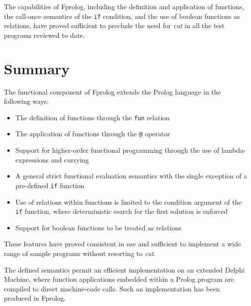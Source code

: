 \documentclass[a4paper,11pt,twoside]{article}
\begin{document}
The capabilities of Fprolog, including the definition and application of
functions, the call-once semantics of the \texttt{if} condition, and the
use of boolean functions as relations, have proved sufficient to preclude the
need for \textit{cut} in all the test programs reviewed to date.

\section{Summary} %

The functional component of Fprolog extends
the Prolog language in the following ways:
\begin{itemize}
\item{The definition of functions through the \texttt{fun} relation}
\item{The application of functions through the \texttt{@} operator}
\item{Support for higher-order functional programming through the
  use of lambda-expressions and currying}
\item{A general strict functional evaluation semantics with
  the single exception of
  a pre-defined \texttt{if} function}
\item{Use of relations within functions is limited to the condition
  argument of the \texttt{if} function, where deterministic search for
  the first solution is enforced}
\item{Support for boolean functions to be treated as relations}
\end{itemize}

These features have proved consistent in use and sufficient to implement
a wide range of sample programs without resorting to \textit{cut}.

The defined semantics permit
an efficient implementation on an extended Delphi Machine, 
where function applications
embedded within a Prolog program are compiled to direct machine-code
calls.  Such an implementation has been produced in Fprolog.


\end{document}
